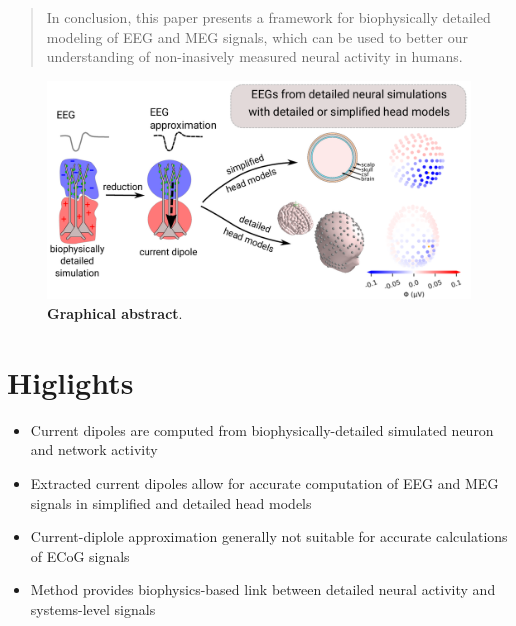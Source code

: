 \documentclass[preprint,10pt,authoryear]{elsarticle}
\begin{document}
\begin{frontmatter}
\begin{abstract}
In conclusion, this paper presents a framework for biophysically detailed modeling of EEG and MEG signals, which can be used to better our understanding of non-inasively measured neural activity in humans.

	\end{abstract}
	
\end{frontmatter}

\linenumbers

	

\begin{figure}[H]
	\centering
	\includegraphics[width=1.0\textwidth]{graph_abst}
	\textbf{Graphical abstract}.
\end{figure}



\section*{Higlights}
\begin{itemize}
\item Current dipoles are computed from biophysically-detailed simulated neuron and network activity
\item Extracted current dipoles allow for accurate computation of EEG and MEG signals in simplified and detailed head models
\item Current-diplole approximation generally not suitable for accurate calculations of ECoG signals
\item Method provides biophysics-based link between detailed neural activity and systems-level signals
\end{itemize}
\end{document}
